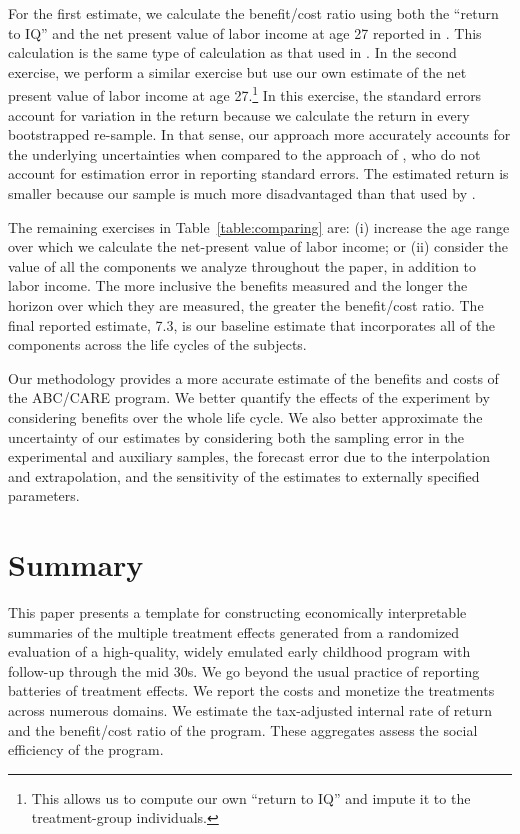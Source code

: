For the first estimate, we calculate the benefit/cost ratio using both the ``return to IQ'' and the net present value of labor income at age 27 reported in \citet{Chetty_Friedman_etal_2011_QJoE}. This calculation is the same type of calculation as that used in \citet{Kline_Walters_2016_QJE}. In the second exercise, we perform a similar exercise but use our own estimate of the net present value of labor income at age 27.\footnote{This allows us to compute our own ``return to IQ'' and impute it to the treatment-group individuals.} In this exercise, the standard errors account for variation in the return because we calculate the return in every bootstrapped re-sample. In that sense, our approach more accurately accounts for the underlying uncertainties when compared to the approach of \citet{Kline_Walters_2016_QJE}, who do not account for estimation error in reporting standard errors. The estimated return is smaller because our sample is much more disadvantaged than that used by \citet{Chetty_Friedman_etal_2011_QJoE}.

The remaining exercises in Table~\ref{table:comparing} are: (i) increase the age range over which we calculate the net-present value of labor income; or (ii) consider the value of all the components we analyze throughout the paper, in addition to labor income. The more inclusive the benefits measured and the longer the horizon over which they are measured, the greater the benefit/cost ratio. The final reported estimate, 7.3, is our baseline estimate that incorporates all of the components across the life cycles of the subjects.

Our methodology provides a more accurate estimate of the benefits and costs of the ABC/CARE program. We better quantify the effects of the experiment by considering benefits over the whole life cycle. We also better approximate the uncertainty of our estimates by considering both the sampling error in the experimental and auxiliary samples, the forecast error due to the interpolation and extrapolation, and the sensitivity of the estimates to externally specified parameters.

\section{Summary} \label{section:conclusion}

\noindent This paper presents a template for constructing economically interpretable summaries of the multiple treatment effects generated from a randomized evaluation of a high-quality, widely emulated early childhood program with follow-up through the mid 30s. We go beyond the usual practice of reporting batteries of treatment effects. We report the costs and monetize the treatments across numerous domains. We estimate the tax-adjusted internal rate of return and the benefit/cost ratio of the program. These aggregates assess the social efficiency of the program.


